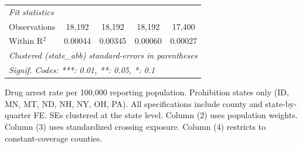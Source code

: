 \begin{table}[htbp]
\begin{tabular}{lcccc}
      \midrule
      \emph{Fit statistics}\\
      Observations                    & 18,192     & 18,192        & 18,192     & 17,400\\  
      Within R$^2$                    & 0.00044    & 0.00345       & 0.00060    & 0.00027\\  
      \midrule \midrule
      \multicolumn{5}{l}{\emph{Clustered (state\_abb) standard-errors in parentheses}}\\
      \multicolumn{5}{l}{\emph{Signif. Codes: ***: 0.01, **: 0.05, *: 0.1}}\\
   \end{tabular}
   
   \par \raggedright \small
   Drug arrest rate per 100,000 reporting population. Prohibition states only (ID, MN, MT, ND, NH, NY, OH, PA). All specifications include county and state-by-quarter FE. SEs clustered at the state level. Column (2) uses population weights. Column (3) uses standardized crossing exposure. Column (4) restricts to constant-coverage counties.
\end{table}

